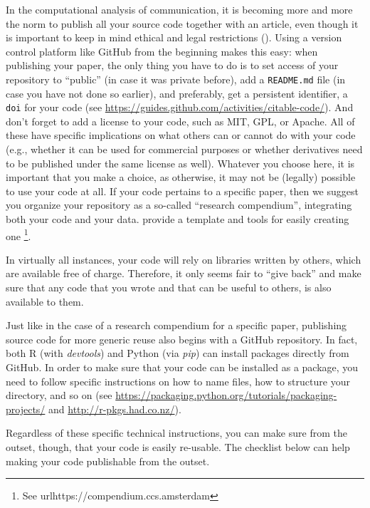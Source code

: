 In the computational analysis of communication, it is becoming more and
more the norm to publish all your source code together with an
article, even though it is important to keep in mind ethical and legal
restrictions (\cite{VanAtteveldt2019}). Using a version control
platform like GitHub from the beginning makes this easy: when
publishing your paper, the only thing you have to do is to set access
of your repository to ``public'' (in case it was private before), add
a \verb|README.md| file (in case you have not done so earlier), and
preferably, get a persistent identifier, a \verb|doi| for your
code (see \url{https://guides.github.com/activities/citable-code/}).
And don't forget to add a license to your code, such as MIT, GPL, or
Apache. All of these have specific implications on what others can or
cannot do with your code (e.g., whether it can be used for commercial
purposes or whether derivatives need to be published under the same license as well). Whatever you choose here, it is important that you make a choice, as otherwise, it may not be (legally) possible to use
your code at all.
If your code pertains to a specific paper, then we suggest you organize
your repository as a so-called ``research compendium'', integrating
both your code and your data.
\cite{compendium} provide a template and tools for easily creating one%
\footnote{See url{https://compendium.ccs.amsterdam}}.

In virtually all instances, your code will rely on libraries written
by others, which are available free of charge. Therefore,
it only seems fair to ``give back'' and make sure that any code that
you wrote and that can be useful to others, is also available to them.

Just like in the case of a research compendium for a specific paper,
publishing source code for more generic reuse also begins with a
GitHub repository. In fact, both R (with \emph{devtools}) and Python
(via \emph{pip}) can install packages directly from GitHub. In order
to make sure that your code can be installed as a package, you
need to follow specific instructions on how to name files, how to
structure your directory, and so on (see \url{https://packaging.python.org/tutorials/packaging-projects/}
and \url{http://r-pkgs.had.co.nz/}).

Regardless of these specific technical instructions, you can make
sure from the outset, though, that your code is easily re-usable.
The checklist below can help making your code publishable from the
outset.

